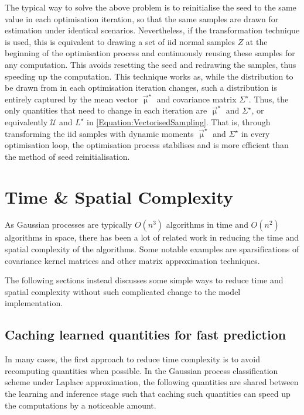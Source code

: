 			The typical way to solve the above problem is to reinitialise the seed to the same value in each optimisation iteration, so that the same samples are drawn for estimation under identical scenarios. Nevertheless, if the transformation technique is used, this is equivalent to drawing a set of iid normal samples $Z$ at the beginning of the optimisation process and continuously reusing these samples for any computation. This avoids resetting the seed and redrawing the samples, thus speeding up the computation. This technique works as, while the distribution to be drawn from in each optimisation iteration changes, such a distribution is entirely captured by the mean vector $\vec{\upmu}^{\star}$ and covariance matrix $\Sigma^{\star}$. Thus, the only quantities that need to change in each iteration are $\vec{\upmu}^{\star}$ and $\Sigma^{\star}$, or equivalently $\mathcal{U}$ and $L^{\star}$ in \eqref{Equation:VectorisedSampling}. That is, through transforming the iid samples with dynamic moments $\vec{\upmu}^{\star}$ and $\Sigma^{\star}$ in every optimisation loop, the optimisation process stabilises and is more efficient than the method of seed reinitialisation.
			
	\section{Time \& Spatial Complexity}
	\label{Appendix:ComputationalAspects:TimeComplexity}
	
		As Gaussian processes are typically $O(n^{3})$ algorithms in time and $O(n^{2})$ algorithms in space, there has been a lot of related work in reducing the time and spatial complexity of the algorithms. Some notable examples are sparsifications of covariance kernel matrices and other matrix approximation techniques.
		
		The following sections instead discusses some simple ways to reduce time and spatial complexity without such complicated change to the model implementation.
		
		\subsection{Caching learned quantities for fast prediction}
		\label{Appendix:ComputationalAspects:TimeSpaceComplexity:Cache}
		
			In many cases, the first approach to reduce time complexity is to avoid recomputing quantities when possible. In the Gaussian process classification scheme under Laplace approximation, the following quantities are shared between the learning and inference stage such that caching such quantities can speed up the computations by a noticeable amount.
			
